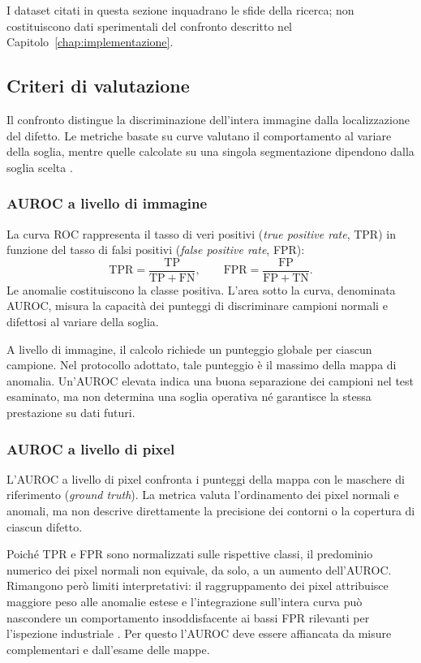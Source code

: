 I dataset citati in questa sezione inquadrano le sfide della ricerca; non costituiscono dati sperimentali del confronto descritto nel Capitolo~\ref{chap:implementazione}.

\subsection{Criteri di valutazione}

Il confronto distingue la discriminazione dell'intera immagine dalla localizzazione del difetto. Le metriche basate su curve valutano il comportamento al variare della soglia, mentre quelle calcolate su una singola segmentazione dipendono dalla soglia scelta \cite{Zheng_et_al._2022}.

\subsubsection{AUROC a livello di immagine}

La curva ROC rappresenta il tasso di veri positivi (\textit{true positive rate}, TPR) in funzione del tasso di falsi positivi (\textit{false positive rate}, FPR):
\[
    \mathrm{TPR}=\frac{\mathrm{TP}}{\mathrm{TP}+\mathrm{FN}},
    \qquad
    \mathrm{FPR}=\frac{\mathrm{FP}}{\mathrm{FP}+\mathrm{TN}}.
\]
Le anomalie costituiscono la classe positiva. L'area sotto la curva, denominata AUROC, misura la capacità dei punteggi di discriminare campioni normali e difettosi al variare della soglia.

A livello di immagine, il calcolo richiede un punteggio globale per ciascun campione. Nel protocollo adottato, tale punteggio è il massimo della mappa di anomalia. Un'AUROC elevata indica una buona separazione dei campioni nel test esaminato, ma non determina una soglia operativa né garantisce la stessa prestazione su dati futuri.

\subsubsection{AUROC a livello di pixel}

L'AUROC a livello di pixel confronta i punteggi della mappa con le maschere di riferimento (\textit{ground truth}). La metrica valuta l'ordinamento dei pixel normali e anomali, ma non descrive direttamente la precisione dei contorni o la copertura di ciascun difetto.

Poiché TPR e FPR sono normalizzati sulle rispettive classi, il predominio numerico dei pixel normali non equivale, da solo, a un aumento dell'AUROC. Rimangono però limiti interpretativi: il raggruppamento dei pixel attribuisce maggiore peso alle anomalie estese e l'integrazione sull'intera curva può nascondere un comportamento insoddisfacente ai bassi FPR rilevanti per l'ispezione industriale \cite{Bertoldo_et_al._2024}. Per questo l'AUROC deve essere affiancata da misure complementari e dall'esame delle mappe.


